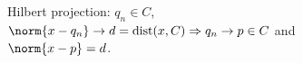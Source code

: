 \documentclass{article}
\begin{document}
\begin{figure}[H]
  \centering
  
  \caption{Hilbert projection: $q_n\in C$, $\norm{x-q_n}\to d=\operatorname{dist}(x,C)\Rightarrow q_n\to p\in C$ and $\norm{x-p}=d$.}
\end{figure}
\end{document}
